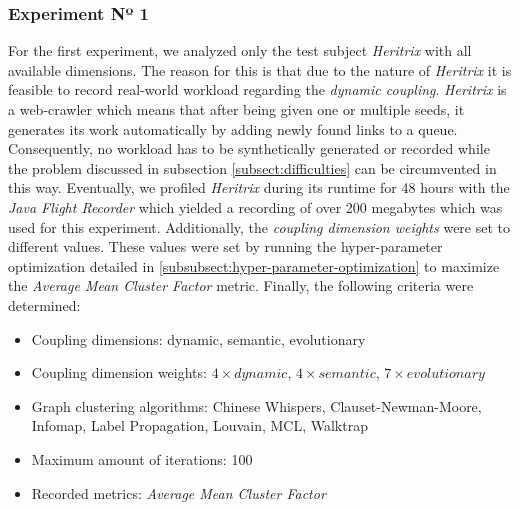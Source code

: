 \documentclass[12pt,a4paper]{report}
\begin{document}
\subsubsection{Experiment Nº 1}
For the first experiment, we analyzed only the test subject \textit{Heritrix} with
all available dimensions. The reason for this is that due to the nature of
\textit{Heritrix} it is feasible to record real\hyp world workload regarding the
\textit{dynamic coupling}. \textit{Heritrix} is a web\hyp crawler which means that
after being given one or multiple seeds, it generates its work automatically by
adding newly found links to a queue. Consequently, no workload has to be
synthetically generated or recorded while the problem discussed in subsection
\ref{subsect:difficulties} can be circumvented in this way.
Eventually, we profiled \textit{Heritrix} during its runtime for 48 hours with the
\textit{Java Flight Recorder} which yielded a recording of over 200 megabytes
which was used for this experiment.
Additionally, the \textit{coupling dimension weights} were set to different values.
These values were set by running the hyper\hyp parameter optimization detailed in
\ref{subsubsect:hyper-parameter-optimization} to maximize the
\textit{Average Mean Cluster Factor} metric.
Finally, the following criteria were determined:
\begin{itemize}[noitemsep]
    \item Coupling dimensions: dynamic, semantic, evolutionary
    \item Coupling dimension weights: $4 \times dynamic$, $4 \times semantic$, $7 \times evolutionary$
    \item Graph clustering algorithms: Chinese Whispers, Clauset-Newman-Moore, Infomap, Label Propagation, Louvain, MCL, Walktrap
    \item Maximum amount of iterations: 100
    \item Recorded metrics: \textit{Average Mean Cluster Factor}
\end{itemize}
\end{document}
